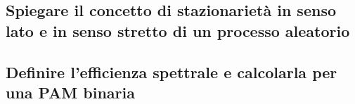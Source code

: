 \documentclass[12pt,oneside,openany]{memoir}
\numberwithin{equation}{subsection}
\begin{document}
\newpage
\subsection{Spiegare il concetto di stazionariet\`a in senso lato e in senso
stretto di un processo aleatorio}


\newpage
\subsection{Definire l'efficienza spettrale e calcolarla per una PAM binaria}


\newpage
\end{document}
